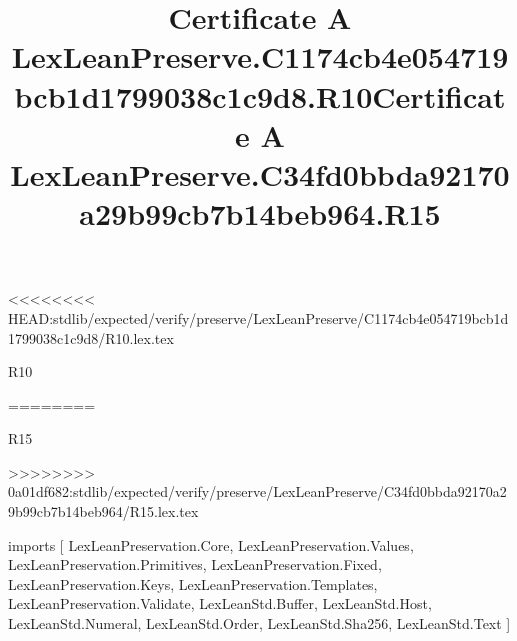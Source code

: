 <<<<<<<< HEAD:stdlib/expected/verify/preserve/LexLeanPreserve/C1174cb4e054719bcb1d1799038c1c9d8/R10.lex.tex
\begin{lexlean}{R10}
\title{Certificate A LexLeanPreserve.C1174cb4e054719bcb1d1799038c1c9d8.R10}
========
\begin{lexlean}{R15}
\title{Certificate A LexLeanPreserve.C34fd0bbda92170a29b99cb7b14beb964.R15}
>>>>>>>> 0a01df682:stdlib/expected/verify/preserve/LexLeanPreserve/C34fd0bbda92170a29b99cb7b14beb964/R15.lex.tex
\begin{coremodule}
imports [
  LexLeanPreservation.Core,
  LexLeanPreservation.Values,
  LexLeanPreservation.Primitives,
  LexLeanPreservation.Fixed,
  LexLeanPreservation.Keys,
  LexLeanPreservation.Templates,
  LexLeanPreservation.Validate,
  LexLeanStd.Buffer,
  LexLeanStd.Host,
  LexLeanStd.Numeral,
  LexLeanStd.Order,
  LexLeanStd.Sha256,
  LexLeanStd.Text
]


\end{coremodule}
\end{lexlean}
\end{lexlean}
